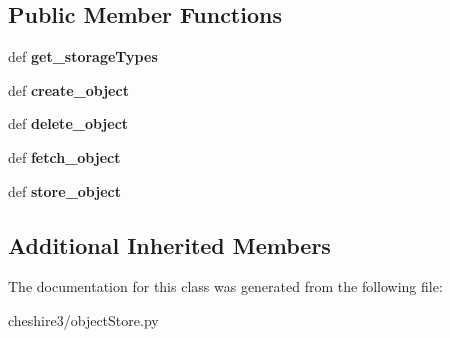 \subsection*{Public Member Functions}
\begin{DoxyCompactItemize}
\item 
\hypertarget{classcheshire3_1_1object_store_1_1_simple_object_store_ad6649a6125fafbfaada9923894af04db}{def {\bfseries get\-\_\-storage\-Types}}\label{classcheshire3_1_1object_store_1_1_simple_object_store_ad6649a6125fafbfaada9923894af04db}

\item 
\hypertarget{classcheshire3_1_1object_store_1_1_simple_object_store_a5d363ef945f4403518dd51cd78c79281}{def {\bfseries create\-\_\-object}}\label{classcheshire3_1_1object_store_1_1_simple_object_store_a5d363ef945f4403518dd51cd78c79281}

\item 
\hypertarget{classcheshire3_1_1object_store_1_1_simple_object_store_a02368b627e53e774673cc100fb2d8b1a}{def {\bfseries delete\-\_\-object}}\label{classcheshire3_1_1object_store_1_1_simple_object_store_a02368b627e53e774673cc100fb2d8b1a}

\item 
\hypertarget{classcheshire3_1_1object_store_1_1_simple_object_store_a3893226830d20f66c8a1a62126e066a4}{def {\bfseries fetch\-\_\-object}}\label{classcheshire3_1_1object_store_1_1_simple_object_store_a3893226830d20f66c8a1a62126e066a4}

\item 
\hypertarget{classcheshire3_1_1object_store_1_1_simple_object_store_aa984aeed971fc96975789b47295ed5eb}{def {\bfseries store\-\_\-object}}\label{classcheshire3_1_1object_store_1_1_simple_object_store_aa984aeed971fc96975789b47295ed5eb}

\end{DoxyCompactItemize}
\subsection*{Additional Inherited Members}


The documentation for this class was generated from the following file\-:\begin{DoxyCompactItemize}
\item 
cheshire3/object\-Store.\-py\end{DoxyCompactItemize}

